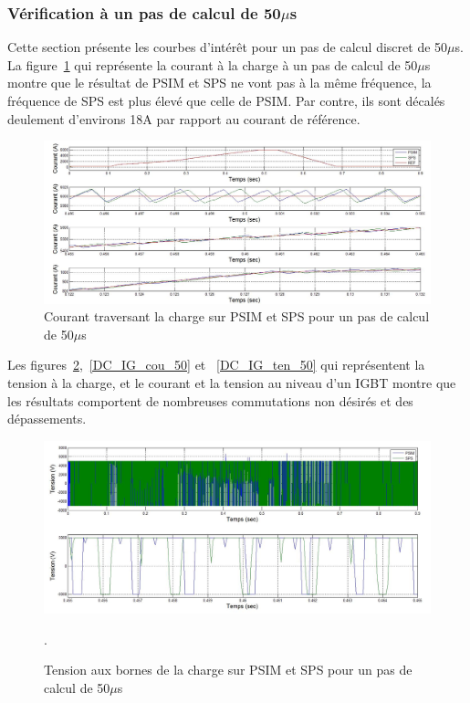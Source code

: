 \documentclass[11pt,letterpaper,final]{report}
\begin{document}
\subsubsection{Vérification à un pas de calcul de 50$\mu$s}
Cette section présente les courbes d'intérêt pour un pas de calcul discret de 50$\mu$s. La figure~\ref{DC_ch_cou_50} qui représente la courant à la charge à un pas de calcul de 50$\mu$s montre que le résultat de PSIM et SPS ne vont pas à la même fréquence, la fréquence de SPS est plus élevé que celle de PSIM. Par contre, ils sont décalés deulement d'environs 18A par rapport au courant de référence.



\begin{figure}[htb]
\centering
\includegraphics[scale=0.5]{Fig/DCPDCN/DCPCourantCharge50u.jpg}
\caption{Courant traversant la charge sur PSIM et SPS pour un pas de calcul de 50$\mu$s}
\label{DC_ch_cou_50}
\end{figure}

Les figures~\ref{DC_ch_ten_50},~\ref{DC_IG_cou_50} et ~\ref{DC_IG_ten_50} qui représentent la tension à la charge, et le courant et la tension au niveau d'un IGBT montre que les résultats comportent de nombreuses commutations non désirés et des dépassements.

\begin{figure}[htb]
\centering
\includegraphics[scale=0.5]{Fig/DCPDCN/DCPTensionCharge50u.jpg}
\caption{Tension aux bornes de la charge sur PSIM et SPS pour un pas de calcul de 50$\mu$s}.
\label{DC_ch_ten_50}
\end{figure}
\end{document}
